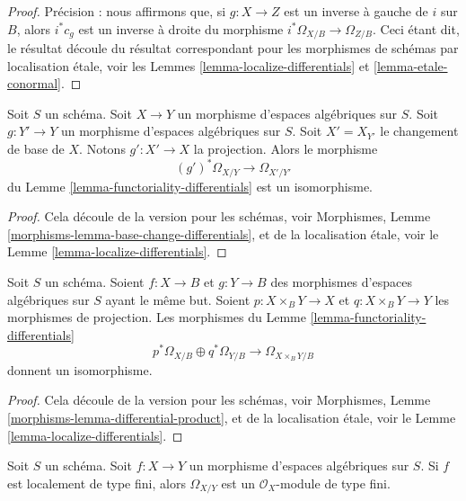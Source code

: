 \begin{proof}
Précision : nous affirmons que, si $g : X \to Z$ est un inverse à gauche de $i$
sur $B$, alors $i^*c_g$ est un inverse à droite du morphisme
$i^*\Omega_{X/B} \to \Omega_{Z/B}$.
Ceci étant dit, le résultat découle du résultat correspondant pour les
morphismes de schémas par localisation étale, voir les
Lemmes \ref{lemma-localize-differentials} et
\ref{lemma-etale-conormal}.
\end{proof}

\begin{lemma}
\label{lemma-base-change-differentials}
Soit $S$ un schéma.
Soit $X \to Y$ un morphisme d'espaces algébriques sur $S$.
Soit $g : Y' \to Y$ un morphisme d'espaces algébriques sur $S$.
Soit $X' = X_{Y'}$ le changement de base de $X$.
Notons $g' : X' \to X$ la projection.
Alors le morphisme
$$
(g')^*\Omega_{X/Y} \to \Omega_{X'/Y'}
$$
du
Lemme \ref{lemma-functoriality-differentials}
est un isomorphisme.
\end{lemma}

\begin{proof}
Cela découle de la version pour les schémas, voir
Morphismes, Lemme \ref{morphisms-lemma-base-change-differentials},
et de la localisation étale, voir le
Lemme \ref{lemma-localize-differentials}.
\end{proof}

\begin{lemma}
\label{lemma-differential-product}
Soit $S$ un schéma.
Soient $f : X \to B$ et $g : Y \to B$ des morphismes d'espaces algébriques
sur $S$ ayant le même but.
Soient $p : X \times_B Y \to X$ et $q : X \times_B Y \to Y$ les
morphismes de projection. Les morphismes du
Lemme \ref{lemma-functoriality-differentials}
$$
p^*\Omega_{X/B} \oplus q^*\Omega_{Y/B}
\longrightarrow
\Omega_{X \times_B Y/B}
$$
donnent un isomorphisme.
\end{lemma}

\begin{proof}
Cela découle de la version pour les schémas, voir
Morphismes, Lemme \ref{morphisms-lemma-differential-product},
et de la localisation étale, voir le
Lemme \ref{lemma-localize-differentials}.
\end{proof}

\begin{lemma}
\label{lemma-finite-type-differentials}
Soit $S$ un schéma.
Soit $f : X \to Y$ un morphisme d'espaces algébriques sur $S$.
Si $f$ est localement de type fini, alors $\Omega_{X/Y}$ est
un $\mathcal{O}_X$-module de type fini.
\end{lemma}


